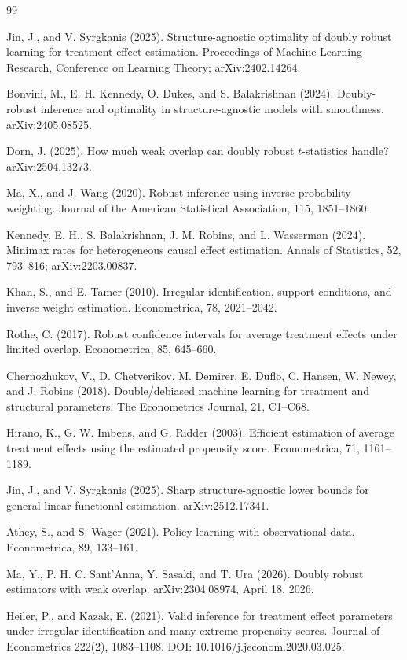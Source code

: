 \documentclass{article}
\begin{document}
\begin{thebibliography}{99}

   Jin, J., and V. Syrgkanis (2025). Structure-agnostic optimality of doubly robust learning for treatment effect estimation. Proceedings of Machine Learning Research, Conference on Learning Theory; arXiv:2402.14264.

   Bonvini, M., E. H. Kennedy, O. Dukes, and S. Balakrishnan (2024). Doubly-robust inference and optimality in structure-agnostic models with smoothness. arXiv:2405.08525.

   Dorn, J. (2025). How much weak overlap can doubly robust \(t\)-statistics handle? arXiv:2504.13273.

   Ma, X., and J. Wang (2020). Robust inference using inverse probability weighting. Journal of the American Statistical Association, 115, 1851--1860.

   Kennedy, E. H., S. Balakrishnan, J. M. Robins, and L. Wasserman (2024). Minimax rates for heterogeneous causal effect estimation. Annals of Statistics, 52, 793--816; arXiv:2203.00837.

   Khan, S., and E. Tamer (2010). Irregular identification, support conditions, and inverse weight estimation. Econometrica, 78, 2021--2042.

   Rothe, C. (2017). Robust confidence intervals for average treatment effects under limited overlap. Econometrica, 85, 645--660.

   Chernozhukov, V., D. Chetverikov, M. Demirer, E. Duflo, C. Hansen, W. Newey, and J. Robins (2018). Double/debiased machine learning for treatment and structural parameters. The Econometrics Journal, 21, C1--C68.

   Hirano, K., G. W. Imbens, and G. Ridder (2003). Efficient estimation of average treatment effects using the estimated propensity score. Econometrica, 71, 1161--1189.

   Jin, J., and V. Syrgkanis (2025). Sharp structure-agnostic lower bounds for general linear functional estimation. arXiv:2512.17341.

   Athey, S., and S. Wager (2021). Policy learning with observational data. Econometrica, 89, 133--161.

   Ma, Y., P. H. C. Sant’Anna, Y. Sasaki, and T. Ura (2026). Doubly robust estimators with weak overlap. arXiv:2304.08974, April 18, 2026.

   Heiler, P., and Kazak, E. (2021). Valid inference for treatment effect parameters under irregular identification and many extreme propensity scores. Journal of Econometrics 222(2), 1083–1108. DOI: 10.1016/j.jeconom.2020.03.025.

\end{thebibliography}
\end{document}
